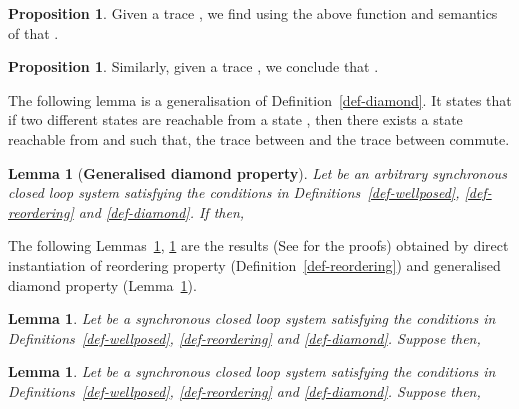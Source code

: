 \documentclass[copyright]{eptcs}
\theoremstyle{plain}
\newtheorem{lemma}[theorem]{Lemma}
\theoremstyle{definition}
\newtheorem{proposition}[theorem]{Proposition}
\begin{document}
\begin{proposition}\label{prop:mu'}
Given a trace , we find using the above function  and semantics of  that .
\end{proposition}
\begin{proposition}\label{prop:mu}
Similarly, given a trace , we conclude that .
\end{proposition}

The following lemma is a generalisation of Definition~\ref{def-diamond}. It states that if two different states  are reachable from a state , then there exists a state  reachable from  and  such that, the trace between  and the trace between  commute.

\begin{lemma}[\textbf{Generalised diamond property}]\label{gdp}
Let  be an arbitrary synchronous closed loop system satisfying the conditions in Definitions~\ref{def-wellposed}, \ref{def-reordering} and \ref{def-diamond}. If  then,
    
\end{lemma}

The following Lemmas~\ref{dppi}, \ref{dppo} are the results (See \citep{desync} for the proofs) obtained by direct instantiation of reordering property (Definition~\ref{def-reordering}) and generalised diamond property (Lemma~\ref{gdp}).

\begin{lemma}\label{dppi}
Let  be a synchronous closed loop system satisfying the conditions in Definitions~\ref{def-wellposed}, \ref{def-reordering} and \ref{def-diamond}. Suppose  then, 
\end{lemma}

\begin{lemma}\label{dppo}
Let  be a synchronous closed loop system satisfying the conditions in Definitions~\ref{def-wellposed}, \ref{def-reordering} and \ref{def-diamond}. Suppose  then, 
\end{lemma}
\end{document}
